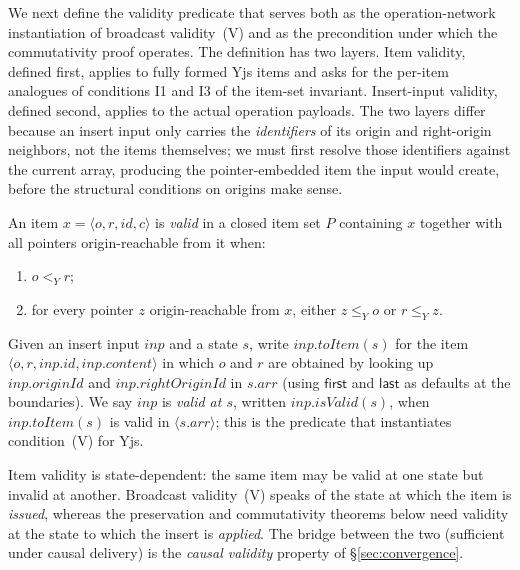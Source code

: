 \documentclass[sigplan,screen]{acmart}
\newcommand{\leanref}[1]{\texttt{#1}}
\newcommand{\YjsLt}{\mathrel{<_Y}}
\newcommand{\YjsLeq}{\mathrel{\leq_Y}}
\newcommand{\First}{\mathsf{first}}
\newcommand{\Last}{\mathsf{last}}
\begin{document}
We next define the validity predicate that serves both as the
operation-network instantiation of broadcast validity~(V) and as the
precondition under which the commutativity proof operates.  The
definition has two layers.  Item validity, defined first, applies to
fully formed Yjs items and asks for the per-item analogues of conditions
I1 and I3 of the item-set invariant.  Insert-input validity, defined
second, applies to the actual operation payloads.  The two layers differ
because an insert input only carries the \emph{identifiers} of its origin
and right-origin neighbors, not the items themselves; we must first
resolve those identifiers against the current array, producing the
pointer-embedded item the input would create, before the structural
conditions on origins make sense.

\begin{definition}[Item and input validity (\leanref{IsItemValid})]
\label{def:item-valid}
An item $x = \langle o, r, \mathit{id}, c \rangle$ is \emph{valid} in a
closed item set $P$ containing $x$ together with all pointers
origin-reachable from it when:
\begin{enumerate}
\item $o \YjsLt r$;
\item for every pointer $z$ origin-reachable from $x$, either
  $z \YjsLeq o$ or $r \YjsLeq z$.
\end{enumerate}
Given an insert input $\mathit{inp}$ and a state $s$, write
$\mathit{inp}.\mathit{toItem}(s)$ for the item
$\langle o, r, \mathit{inp}.\mathit{id}, \mathit{inp}.\mathit{content}
\rangle$ in which $o$ and $r$ are obtained by looking up
$\mathit{inp}.\mathit{originId}$ and
$\mathit{inp}.\mathit{rightOriginId}$ in $s.\mathit{arr}$ (using $\First$
and $\Last$ as defaults at the boundaries).  We say $\mathit{inp}$ is
\emph{valid at $s$}, written $\mathit{inp}.\mathit{isValid}(s)$, when
$\mathit{inp}.\mathit{toItem}(s)$ is valid in
$\langle s.\mathit{arr} \rangle$; this is the predicate that instantiates
condition~(V) for Yjs.
\end{definition}

\noindent
Item validity is state-dependent: the same item may be valid at one state
but invalid at another.  Broadcast validity~(V) speaks of the state at
which the item is \emph{issued}, whereas the preservation and
commutativity theorems below need validity at the state to which the
insert is \emph{applied}.  The bridge between the two (sufficient under
causal delivery) is the \emph{causal validity} property of
\S\ref{sec:convergence}.
\end{document}
